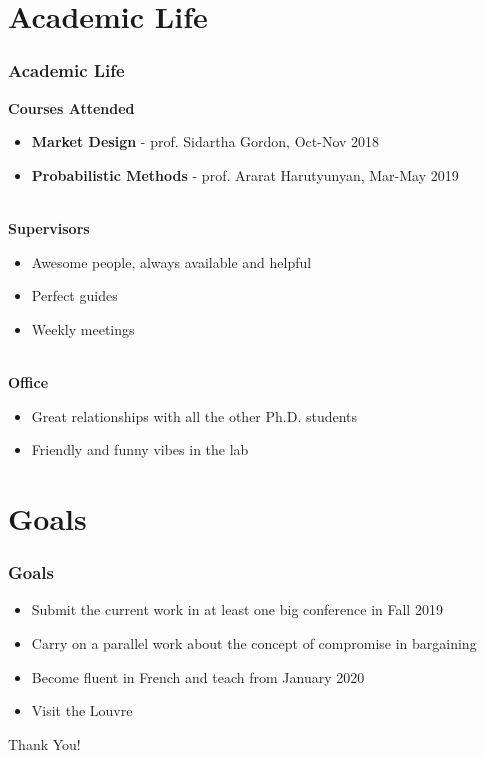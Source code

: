 \documentclass{beamer}
\begin{document}
\section{Academic Life}
\begin{frame}
	\frametitle{Academic Life}
	\textbf{Courses Attended}  
	\begin{itemize}
		\item \textbf{Market Design} - prof. Sidartha Gordon, Oct-Nov 2018
		\item \textbf{Probabilistic Methods} - prof. Ararat Harutyunyan, Mar-May 2019
	\end{itemize}~\\
	\textbf{Supervisors} 
	\begin{itemize}
		\item Awesome people, always available and helpful
		\item Perfect guides
		\item Weekly meetings
	\end{itemize}~\\
	\textbf{Office}  
	\begin{itemize}
		\item Great relationships with all the other Ph.D. students
		\item Friendly and funny vibes in the lab
	\end{itemize}
\end{frame}

\section{Goals}
\begin{frame}
	\frametitle{Goals} 
	\begin{itemize}
		\item Submit the current work in at least one big conference in Fall 2019
		\item Carry on a parallel work about the concept of compromise in bargaining 
		\item Become fluent in French and teach from January 2020
		\item Visit the Louvre 
	\end{itemize}
\end{frame}

\addtocounter{framenumber}{-1}
\begin{frame}[plain]
	\centering \color{darkred}\LARGE Thank You!
\end{frame}





 


\end{document}
